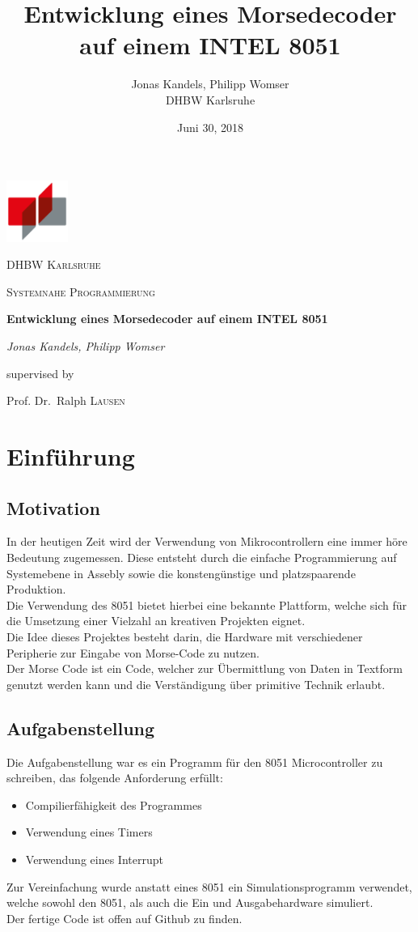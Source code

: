 \documentclass[a4paper,12pt]{article}
\title{Entwicklung eines Morsedecoder auf einem INTEL 8051}
\date{Juni 30, 2018}
\author{Jonas Kandels, Philipp Womser\\ DHBW Karlsruhe}
\begin{document}
	\begin{center}
		\includegraphics[width=0.15\textwidth]{Bilder/DHBW.png}\par\vspace{1cm}
		{\scshape\LARGE DHBW Karlsruhe \par}
		\vspace{1cm}
		{\scshape\Large Systemnahe Programmierung\par}
		\vspace{1.5cm}
		{\huge\bfseries Entwicklung eines Morsedecoder auf einem INTEL 8051\par}
		\vspace{2cm}
		{\Large\itshape Jonas Kandels, Philipp Womser\par}
		\vfill
		supervised by\par
		Prof. Dr.~Ralph \textsc{Lausen}
	\end{center}


\vfill
\newpage

	\section{Einführung}
	\subsection{Motivation}
	In der heutigen Zeit wird der Verwendung von Mikrocontrollern eine immer höre Bedeutung zugemessen. Diese entsteht durch die einfache Programmierung auf Systemebene in Assebly sowie die konstengünstige und platzspaarende Produktion.\\
	Die Verwendung des 8051  bietet hierbei eine bekannte Plattform, welche sich für die Umsetzung einer Vielzahl an kreativen Projekten eignet.\\
	Die Idee dieses Projektes besteht darin, die Hardware mit verschiedener Peripherie zur Eingabe von Morse-Code zu nutzen.\\
	Der Morse Code ist ein Code, welcher zur Übermittlung von Daten in Textform genutzt werden kann und die Verständigung über primitive Technik erlaubt. 
	\subsection{Aufgabenstellung}
	Die Aufgabenstellung war es ein Programm für den 8051 Microcontroller zu schreiben, das folgende Anforderung erfüllt:
	\begin{itemize}
		\item Compilierfähigkeit des Programmes
		\item Verwendung eines Timers
		\item Verwendung eines Interrupt
	\end{itemize}
	Zur Vereinfachung wurde anstatt eines 8051 ein Simulationsprogramm verwendet, welche sowohl den 8051, als auch die Ein und Ausgabehardware simuliert.\\
	Der fertige Code ist offen auf Github zu finden.
	
\end{document}
